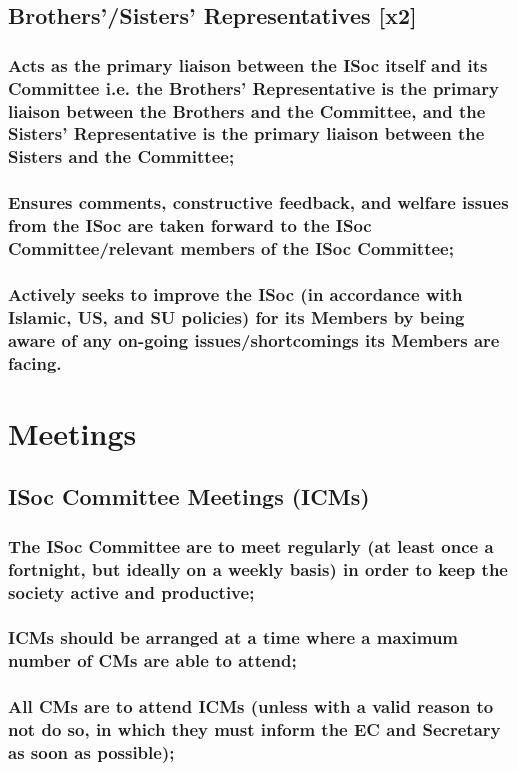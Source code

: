 \documentclass[12pt]{article}
\begin{document}
\subsection{Brothers'/Sisters' Representatives [x2]}
\subsubsection{Acts as the primary liaison between the ISoc itself and its Committee i.e. the Brothers' Representative is the primary liaison between the Brothers and the Committee, and the Sisters' Representative is the primary liaison between the Sisters and the Committee;}
\subsubsection{Ensures comments, constructive feedback, and welfare issues from the ISoc are taken forward to the ISoc Committee/relevant members of the ISoc Committee;}
\subsubsection{Actively seeks to improve the ISoc (in accordance with Islamic, US, and SU policies) for its Members by being aware of any on-going issues/shortcomings its Members are facing.}
\hspace{1pt}

\section{Meetings}
\subsection{ISoc Committee Meetings (ICMs)}
\subsubsection{The ISoc Committee are to meet regularly (at least once a fortnight, but ideally on a weekly basis) in order to keep the society active and productive;}
\subsubsection{ICMs should be arranged at a time where a maximum number of CMs are able to attend;}
\subsubsection{All CMs are to attend ICMs (unless with a valid reason to not do so, in which they must inform the EC and Secretary as soon as possible);}
\end{document}
